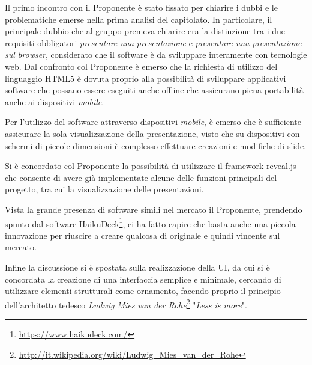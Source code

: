 Il primo incontro con il Proponente è stato fissato per chiarire i dubbi e le problematiche emerse nella prima analisi del capitolato. In particolare, il principale dubbio che al gruppo premeva chiarire era la distinzione tra i due requisiti obbligatori \textit{presentare una presentazione} e \textit{presentare una presentazione sul browser}, considerato che il software è da sviluppare interamente con tecnologie web. Dal confronto col Proponente è emerso che la richiesta di utilizzo del linguaggio HTML5 è dovuta proprio alla possibilità di sviluppare applicativi software che possano essere eseguiti anche offline che assicurano piena portabilità anche ai dispositivi \textit{mobile}. 

\noindent Per l'utilizzo del software \PROGETTO{} attraverso dispositivi \textit{mobile}, è emerso che è sufficiente assicurare la sola visualizzazione della presentazione, visto che su dispositivi con schermi di piccole dimensioni è complesso effettuare creazioni e modifiche di slide.

\noindent Si è concordato col Proponente la possibilità di utilizzare il framework reveal.js che consente di avere già implementate alcune delle funzioni principali del progetto, tra cui la visualizzazione delle presentazioni.

\noindent Vista la grande presenza di software simili nel mercato il Proponente, prendendo spunto dal software HaikuDeck\footnote{\url{https://www.haikudeck.com/}}, ci ha fatto capire che basta anche una piccola innovazione per riuscire a creare qualcosa di originale e quindi vincente sul mercato. 

\noindent Infine la discussione si è spostata sulla realizzazione della UI, da cui si è concordata la creazione di una interfaccia semplice e minimale, cercando di utilizzare elementi strutturali come ornamento, facendo proprio il principio dell'architetto tedesco \textit{Ludwig Mies van der Rohe}\footnote{\url{http://it.wikipedia.org/wiki/Ludwig_Mies_van_der_Rohe}} "\textit{Less is more}". 